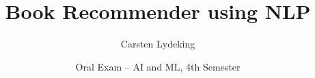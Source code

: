 \documentclass[aspectratio=169]{beamer}
\title{Book Recommender using NLP}
\author{Carsten Lydeking}
\institute{Zealand Business College}
\date{Oral Exam -- AI and ML, 4th Semester}
\begin{document}
\begin{frame}
  \titlepage
\end{frame}














\end{document}
